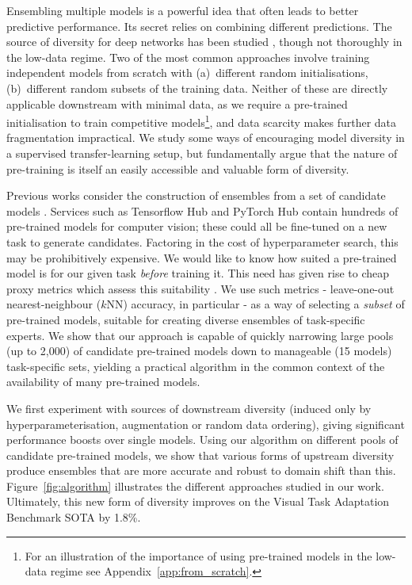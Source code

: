 \documentclass{article} \usepackage{iclr2021_conference,times}
\begin{document}
Ensembling multiple models is a powerful idea that often leads to better predictive performance.
Its secret relies on combining different predictions.
The source of diversity for deep networks has been studied \citep{fort2019deep,wenzel2020hyperparameter}, though not thoroughly in the low-data regime.
Two of the most common approaches involve training independent models from scratch with (a)~different random initialisations, (b)~different random subsets of the training data.
Neither of these are directly applicable downstream with minimal data, as we require a pre-trained initialisation to train competitive models\footnote{For an illustration of the importance of using pre-trained models in the low-data regime see Appendix~\ref{app:from_scratch}.}, and data scarcity makes further data fragmentation impractical.
We study some ways of encouraging model diversity in a supervised transfer-learning setup, but fundamentally argue that the nature of pre-training is itself an easily accessible and valuable form of diversity.

Previous works consider the construction of ensembles from a set of candidate models \citep{caruana2004ensembleselection}. Services such as Tensorflow Hub \citep{tfhub} and PyTorch Hub \citep{pytorch-hub} contain hundreds of pre-trained models for computer vision; these could all be fine-tuned on a new task to generate candidates. Factoring in the cost of hyperparameter search, this may be prohibitively expensive. We would like to know how suited a pre-trained model is for our given task \emph{before} training it. This need has given rise to cheap proxy metrics which assess this suitability \citep{puigcerver2020experts}. We use such metrics - leave-one-out nearest-neighbour ($k$NN) accuracy, in particular - as a way of selecting a \textit{subset} of pre-trained models, suitable for creating diverse ensembles of task-specific experts. We show that our approach is capable of quickly narrowing large pools (up to 2,000) of candidate pre-trained models down to manageable (15 models) task-specific sets, yielding a practical algorithm in the common context of the availability of many pre-trained models.

We first experiment with sources of downstream diversity (induced only by hyperparameterisation, augmentation or random data ordering), giving significant performance boosts over single models. Using our algorithm on different pools of candidate pre-trained models, we show that various forms of upstream diversity produce ensembles that are more accurate and robust to domain shift than this. Figure~\ref{fig:algorithm} illustrates the different approaches studied in our work. Ultimately, this new form of diversity improves on the Visual Task Adaptation Benchmark \citep{zhai2019largescale} SOTA by 1.8\%.
\end{document}
